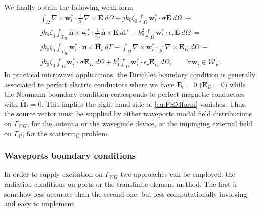 \noindent We finally obtain the following weak form
\begin{multline}
\label{eq:FEMform}
\int_\Omega \nabla \times \mathbf{w}_i^* \cdot \frac{1}{\mu_r} \nabla \times \mathbf{E} \ d\Omega +
 j k_0 \zeta_0 \int_\Omega \mathbf{w}_i^* \cdot \sigma \mathbf{E} \ d\Omega \ + \\
 j k_0 \zeta_0 \int_{\mathrm{\Gamma}_R} \hat{\mathbf{n}} \times \mathbf{w}_i^* \cdot \frac{1}{Z_s} \hat{\mathbf{n}} \times \mathbf{E} \ d\mathrm{\Gamma} \ - 
 k_0^2 \int_\Omega \mathbf{w}_i^* \cdot \epsilon_r \mathbf{E} \ d\Omega \ = \\
 j k_0 \zeta_0 \int_{\Gamma_{H}} \mathbf{w}_i^* \cdot \hat{\mathbf{n}} \times \bar{\mathbf{H}}_t \ d\Gamma - 
\int_\Omega \nabla \times \mathbf{w}_i^* \cdot \frac{1}{\mu_r} \nabla \times \mathbf{E}_D \ d\Omega \ - \\
j k_0 \zeta_0 \int_\Omega \mathbf{w}_i^* \cdot \sigma \mathbf{E}_D \ d\Omega +
 k_0^2 \int_\Omega \mathbf{w}_i^* \cdot \epsilon_r \mathbf{E}_D \ d\Omega, 
\qquad \forall \mathbf{w}_i \in \mathcal{W}_E.
\end{multline}
\noindent In practical microwave applications, the Dirichlet boundary condition is generally associated to perfect electric conductors where we have $\bar{\mathbf{E}}_t = 0$ ($\mathbf{E}_D = 0$) while the Neumann boundary condition corresponds to perfect magnetic conductors with $\bar{\mathbf{H}}_t = 0$. This implies the right-hand side of \eqref{eq:FEMform} vanishes. Thus, the source vector must be supplied by either waveports modal field distributions on $\Gamma_{WG}$, for the antenna or the waveguide device, or the impinging external field on $\Gamma_R$, for the scattering problem.

\subsubsection{Waveports boundary conditions}

In order to supply excitation on $\Gamma_{WG}$ two approaches can be employed: the radiation conditions on ports or the transfinite element method. The first is somehow less accurate than the second one, but less computationally involving and easy to implement.


